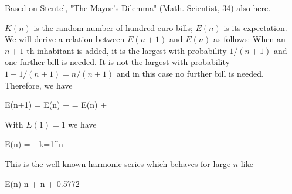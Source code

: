 
Based on Steutel, "The Mayor's Dilemma" (Math. Scientist, 34) also  \href{files/34_2_1.pdf}{here}.

$K(n)$ is the random number of hundred euro bills; $E(n)$ is its expectation. We will derive a relation between $E(n+1)$ and $E(n)$ as follows: When an $n+1$-th inhabitant is added, it is the largest with probability $1/(n+1)$ and one further bill is needed. It is not the largest with probability $1 - 1/(n+1) = n/(n+1)$ and in this case no further bill is needed. Therefore, we have 

\bee
E(n+1) = E(n) + \left[ E(n)+1 \right] = E(n) + 
\eee

With $E(1) = 1$ we have

\bee
E(n) = \sum_{k=1}^n 
\eee

This is the well-known harmonic series which behaves for large $n$ like

\bee
E(n) \approx \log n + \gamma \approx \log n + 0.5772
\eee

